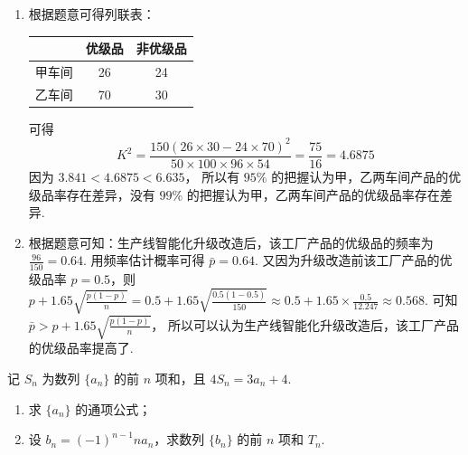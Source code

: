 \begin{solution}
\begin{enumerate}
\item 根据题意可得列联表：

\begin{center}
\renewcommand{\arraystretch}{1.3}
\begin{tabular}{c|c|c}
 & 优级品 & 非优级品 \\
\hline
甲车间 & 26 & 24 \\
\hline
乙车间 & 70 & 30
\end{tabular}
\end{center}
可得
\[
K^2=\frac{150\left( 26\times 30-24\times 70 \right)^2}{50\times 100\times 96\times 54}=\frac{75}{16}=4.6875
\]
因为
\(3.841<4.6875<6.635\)，
所以有 \( 95\% \) 的把握认为甲，乙两车间产品的优级品率存在差异，没有 \( 99\% \) 的把握认为甲，乙两车间产品的优级品率存在差异.

\item 根据题意可知：生产线智能化升级改造后，该工厂产品的优级品的频率为
\(\frac{96}{150}=0.64\).
用频率估计概率可得 \( \bar p=0.64 \).
又因为升级改造前该工厂产品的优级品率 \( p=0.5 \)，则
\(p+1.65\sqrt{\frac{p(1-p)}{n}}=0.5+1.65\sqrt{\frac{0.5(1-0.5)}{150}}\approx 0.5+1.65\times \frac{0.5}{12.247}\approx 0.568\).
可知
\(\bar p>p+1.65\sqrt{\frac{p(1-p)}{n}}\)，
所以可以认为生产线智能化升级改造后，该工厂产品的优级品率提高了.
\end{enumerate}
\end{solution}

\begin{problem}
记 \( S_n \) 为数列 \( \{a_n\} \) 的前 \( n \) 项和，且 \( 4S_n=3a_n+4 \).

\begin{enumerate}
\item 求 \( \{a_n\} \) 的通项公式；
\item 设 \( b_n=\left( -1 \right)^{n-1}na_n \)，求数列 \( \{b_n\} \) 的前 \( n \) 项和 \( T_n \).
\end{enumerate}
\end{problem}

